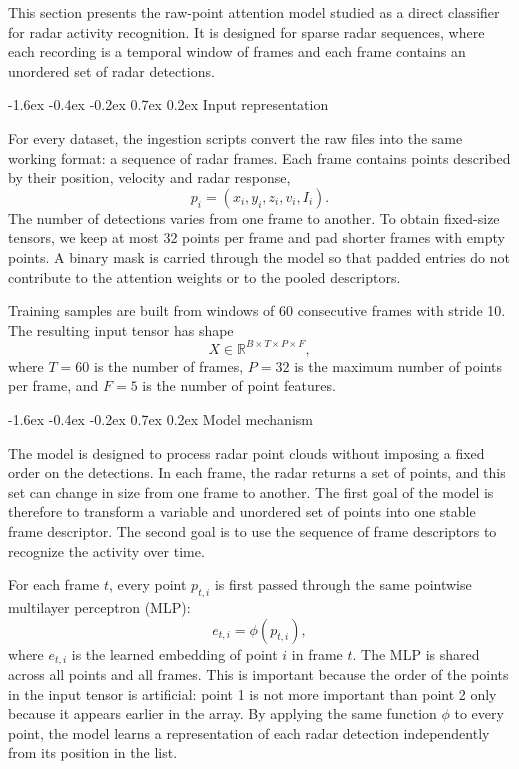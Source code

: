 \documentclass[10pt,twocolumn]{article}
\makeatletter
\renewcommand{\subsection}{%
  \@startsection{subsection}{2}{\z@}%
  {-1.6ex \@plus -0.4ex \@minus -0.2ex}%
  {0.7ex \@plus 0.2ex}%
  {\normalfont\normalsize\bfseries}}
\makeatother
\begin{document}
This section presents the raw-point attention model studied as a direct
classifier for radar activity recognition. It is designed for sparse radar
sequences, where each recording is a temporal window of frames and each frame
contains an unordered set of radar detections.

\subsection{Input representation}

For every dataset, the ingestion scripts convert the raw files into the same
working format: a sequence of radar frames. Each frame contains points described
by their position, velocity and radar response,
\[
    p_i = (x_i, y_i, z_i, v_i, I_i).
\]
The number of detections varies from one frame to another. To obtain fixed-size
tensors, we keep at most 32 points per frame and pad shorter frames with empty
points. A binary mask is carried through the model so that padded entries do
not contribute to the attention weights or to the pooled descriptors.

Training samples are built from windows of 60 consecutive frames with stride
10. The resulting input tensor has shape
\[
    X \in \mathbb{R}^{B \times T \times P \times F},
\]
where $T=60$ is the number of frames, $P=32$ is the maximum number of points per
frame, and $F=5$ is the number of point features.

\subsection{Model mechanism}

The model is designed to process radar point clouds without imposing a fixed
order on the detections. In each frame, the radar returns a set of points, and
this set can change in size from one frame to another. The first goal of the
model is therefore to transform a variable and unordered set of points into one
stable frame descriptor. The second goal is to use the sequence of frame
descriptors to recognize the activity over time.

For each frame $t$, every point $p_{t,i}$ is first passed through the same
pointwise multilayer perceptron (MLP):
\[
    e_{t,i} = \phi(p_{t,i}),
\]
where $e_{t,i}$ is the learned embedding of point $i$ in frame $t$. The MLP is
shared across all points and all frames. This is important because the order of
the points in the input tensor is artificial: point 1 is not more important than
point 2 only because it appears earlier in the array. By applying the same
function $\phi$ to every point, the model learns a representation of each radar
detection independently from its position in the list.
\end{document}
